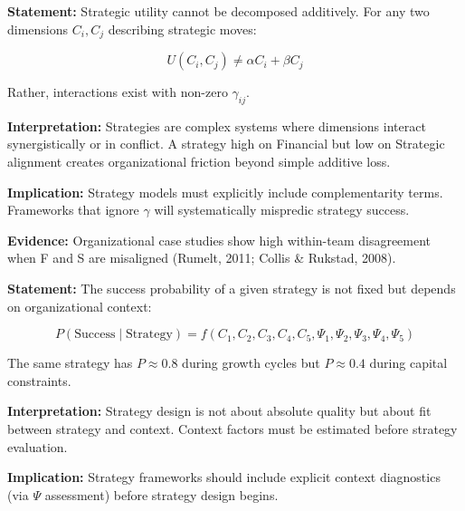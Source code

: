 \begin{tcolorbox}[colback=gray!5!white, colframe=gray!75!black,
    title=Axiom SDM-1: Complementarity Necessity]

\textbf{Statement:} Strategic utility cannot be decomposed additively. For any two dimensions $C_i, C_j$ describing strategic moves:

\begin{equation}
U(C_i, C_j) \neq \alpha C_i + \beta C_j
\end{equation}

Rather, interactions exist with non-zero $\gamma_{ij}$.

\textbf{Interpretation:} Strategies are complex systems where dimensions interact synergistically or in conflict. A strategy high on Financial but low on Strategic alignment creates organizational friction beyond simple additive loss.

\textbf{Implication:} Strategy models must explicitly include complementarity terms. Frameworks that ignore $\gamma$ will systematically mispredic strategy success.

\textbf{Evidence:} Organizational case studies show high within-team disagreement when F and S are misaligned (Rumelt, 2011; Collis \& Rukstad, 2008).

\end{tcolorbox}

\begin{tcolorbox}[colback=gray!5!white, colframe=gray!75!black,
    title=Axiom SDM-2: Context Modulation]

\textbf{Statement:} The success probability of a given strategy is not fixed but depends on organizational context:

\begin{equation}
P(\text{Success} \mid \text{Strategy}) = f(C_1, C_2, C_3, C_4, C_5, \Psi_1, \Psi_2, \Psi_3, \Psi_4, \Psi_5)
\end{equation}

The same strategy has $P \approx 0.8$ during growth cycles but $P \approx 0.4$ during capital constraints.

\textbf{Interpretation:} Strategy design is not about absolute quality but about fit between strategy and context. Context factors must be estimated before strategy evaluation.

\textbf{Implication:} Strategy frameworks should include explicit context diagnostics (via $\Psi$ assessment) before strategy design begins.

\end{tcolorbox}

